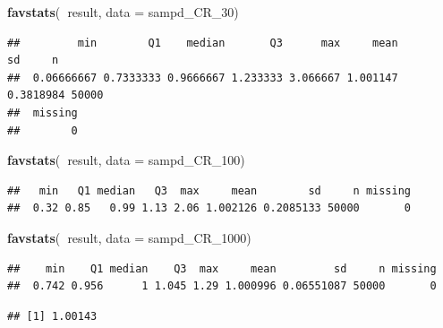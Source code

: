 \documentclass[]{book}
\newenvironment{Shaded}{\begin{snugshade}}{\end{snugshade}}
\newcommand{\DataTypeTok}[1]{\textcolor[rgb]{0.13,0.29,0.53}{#1}}
\newcommand{\DecValTok}[1]{\textcolor[rgb]{0.00,0.00,0.81}{#1}}
\newcommand{\KeywordTok}[1]{\textcolor[rgb]{0.13,0.29,0.53}{\textbf{#1}}}
\newcommand{\NormalTok}[1]{#1}
\newcommand{\OperatorTok}[1]{\textcolor[rgb]{0.81,0.36,0.00}{\textbf{#1}}}
\theoremstyle{definition}
\theoremstyle{definition}
\theoremstyle{definition}
\theoremstyle{remark}
\begin{document}
\begin{Shaded}
\begin{Highlighting}[]
\KeywordTok{favstats}\NormalTok{(}\OperatorTok{~}\NormalTok{result, }\DataTypeTok{data =}\NormalTok{ sampd_CR_}\DecValTok{30}\NormalTok{)}
\end{Highlighting}
\end{Shaded}

\begin{verbatim}
##         min        Q1    median       Q3      max     mean        sd     n
##  0.06666667 0.7333333 0.9666667 1.233333 3.066667 1.001147 0.3818984 50000
##  missing
##        0
\end{verbatim}

\begin{Shaded}
\begin{Highlighting}[]
\KeywordTok{favstats}\NormalTok{(}\OperatorTok{~}\NormalTok{result, }\DataTypeTok{data =}\NormalTok{ sampd_CR_}\DecValTok{100}\NormalTok{)}
\end{Highlighting}
\end{Shaded}

\begin{verbatim}
##   min   Q1 median   Q3  max     mean        sd     n missing
##  0.32 0.85   0.99 1.13 2.06 1.002126 0.2085133 50000       0
\end{verbatim}

\begin{Shaded}
\begin{Highlighting}[]
\KeywordTok{favstats}\NormalTok{(}\OperatorTok{~}\NormalTok{result, }\DataTypeTok{data =}\NormalTok{ sampd_CR_}\DecValTok{1000}\NormalTok{)}
\end{Highlighting}
\end{Shaded}

\begin{verbatim}
##    min    Q1 median    Q3  max     mean         sd     n missing
##  0.742 0.956      1 1.045 1.29 1.000996 0.06551087 50000       0
\end{verbatim}

\begin{Shaded}
\end{Shaded}

\begin{verbatim}
## [1] 1.00143
\end{verbatim}
\end{document}
